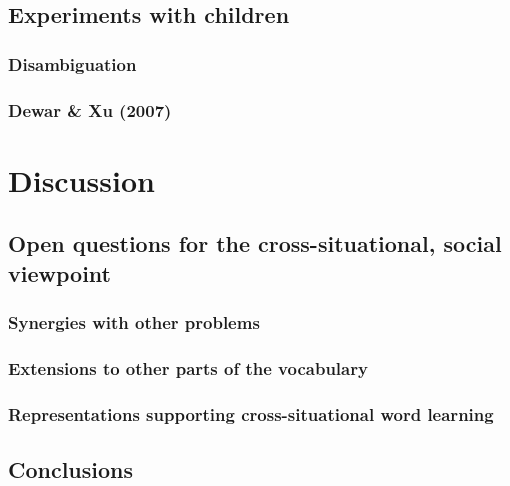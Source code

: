 \documentclass[man,noapacite,12pt]{apa2}
\begin{document}
\subsection{Experiments with children}

\subsubsection{Disambiguation}

\subsubsection{Dewar \& Xu (2007)}



\section{Discussion}



\subsection{Open questions for the cross-situational, social viewpoint}

\subsubsection{Synergies with other problems}

\subsubsection{Extensions to other parts of the vocabulary}

\subsubsection{Representations supporting cross-situational word learning}

\cite{yurovskyunderreview}

\subsection{Conclusions}

\newpage



\end{document}
